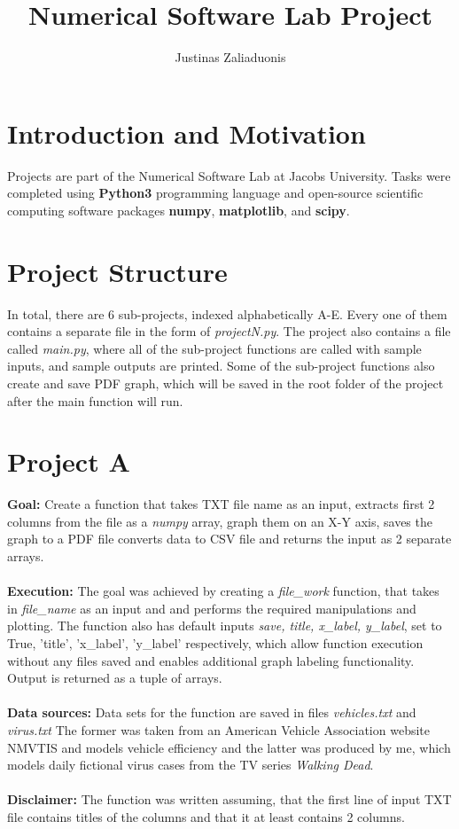 \documentclass[a4paper,12pt]{article}
\begin{document}
\title{Numerical Software Lab Project}
\author{Justinas Zaliaduonis}
\maketitle


\section{Introduction and Motivation}

Projects are part of the Numerical Software Lab at Jacobs University. Tasks were completed using \textbf{Python3} programming language and open-source scientific computing software packages \textbf{numpy}, \textbf{matplotlib}, and \textbf{scipy}.

\section{Project Structure} 

In total, there are 6 sub-projects, indexed alphabetically A-E. Every one of them contains a separate file in the form of \textit{projectN.py}. The project also contains a file called \textit{main.py}, where all of the sub-project functions are called with sample inputs, and sample outputs are printed. Some of the sub-project functions also create and save PDF graph, which will be saved in the root folder of the project after the main function will run.

\section{Project A}
\textbf{Goal:} Create a function that takes TXT file name as an input, extracts first 2 columns from the file as a \textit{numpy} array, graph them on an X-Y axis, saves the graph to a PDF file converts data to CSV file and returns the input as 2 separate arrays. \\ \\ \textbf{Execution: } The goal was achieved by creating a \textit{file\_work} function, that takes in \textit{file\_name} as an input and and performs the required manipulations and plotting. The function also has default inputs \textit{save, title, x\_label, y\_label}, set to True, 'title', 'x\_label', 'y\_label' respectively, which allow function execution without any files saved and enables additional graph labeling functionality. Output is returned as a tuple of arrays.
\\ \\ \textbf{Data sources:} Data sets for the function are saved in files \textit{vehicles.txt} and \textit{virus.txt} The former was taken from an American Vehicle Association website NMVTIS and models vehicle efficiency and the latter was produced by me, which models daily fictional virus cases from the TV series \textit{Walking Dead}. \\ \\ \textbf{Disclaimer:} The function was written assuming, that the first line of input TXT file contains titles of the columns and
that it at least contains 2 columns.
\end{document}
